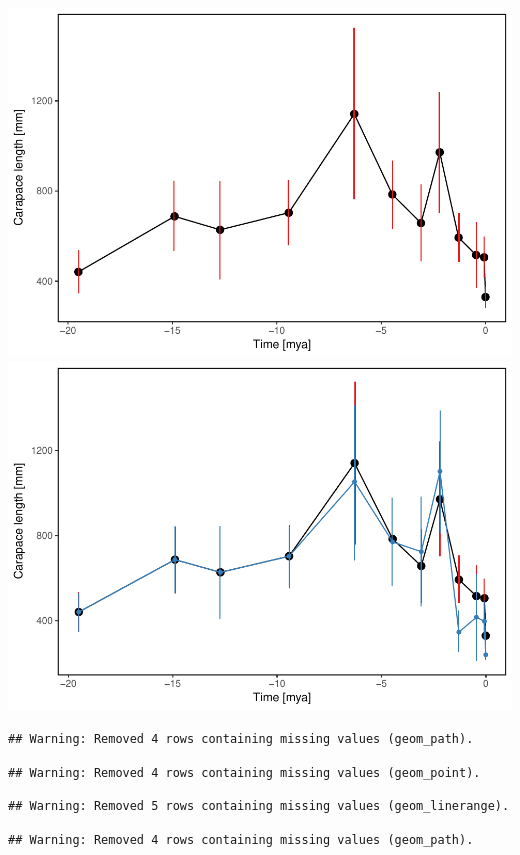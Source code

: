 \documentclass[]{article}
\begin{document}
\includegraphics{MA_JJ_files/figure-latex/paleoTScombined-1.pdf}
\includegraphics{MA_JJ_files/figure-latex/paleoTScombined-2.pdf}

\begin{verbatim}
## Warning: Removed 4 rows containing missing values (geom_path).
\end{verbatim}

\begin{verbatim}
## Warning: Removed 4 rows containing missing values (geom_point).
\end{verbatim}

\begin{verbatim}
## Warning: Removed 5 rows containing missing values (geom_linerange).
\end{verbatim}

\begin{verbatim}
## Warning: Removed 4 rows containing missing values (geom_path).
\end{verbatim}
\end{document}

